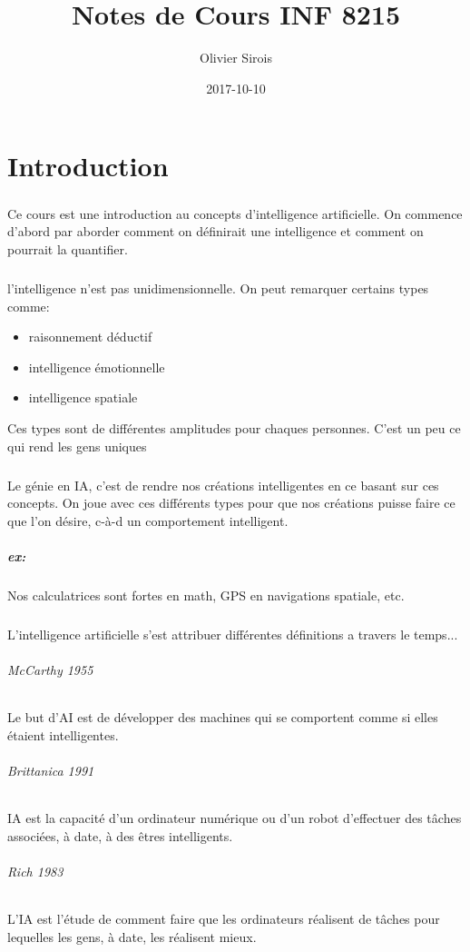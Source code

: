 \documentclass[oneside]{book}
\title{Notes de Cours INF 8215}
\date{2017-10-10}
\author{Olivier Sirois}
\begin{document}
\setlength\parindent{0pt}
\setcounter{page}{1}
\maketitle
\newpage

\tableofcontents
\chapter{Introduction}
\paragraph{}
Ce cours est une introduction au concepts d'intelligence artificielle. On commence d'abord par aborder comment on définirait une intelligence et comment on pourrait la quantifier.
\paragraph{}
l'intelligence n'est pas unidimensionnelle. On peut remarquer certains types comme:
\begin{itemize}
\item raisonnement déductif
\item intelligence émotionnelle
\item intelligence spatiale
\end{itemize}
Ces types sont de différentes amplitudes pour chaques personnes. C'est un peu ce qui rend les gens uniques

\paragraph{}
Le génie en IA, c'est de rendre nos créations intelligentes en ce basant sur ces concepts. On joue avec ces différents types pour que nos créations puisse faire ce que l'on désire, c-à-d un comportement intelligent.
\paragraph{ex:}
Nos calculatrices sont fortes en math, GPS en navigations spatiale, etc.
\paragraph{}
L'intelligence artificielle s'est attribuer différentes définitions a travers le temps...
\subparagraph{McCarthy 1955}
Le but d’AI est de développer des machines qui se comportent
comme si elles étaient intelligentes.
\subparagraph{Brittanica 1991}
IA est la capacité d’un ordinateur numérique ou d’un robot
d’effectuer des tâches associées, à date, à des êtres intelligents.
\subparagraph{Rich 1983}
L’IA est l’étude de comment faire que les ordinateurs réalisent de
tâches pour lequelles les gens, à date, les réalisent mieux.
\end{document}
